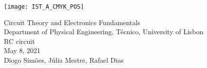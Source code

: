 
\thispagestyle {empty}

\texttt{[image: IST\_A\_CMYK\_POS]}

\begin{center}
%
\vspace{1.0cm}

\vspace{1cm}
{\FontLb Circuit Theory and Electronics Fundamentals} \\ %
\vspace{1cm}
{\FontSn Department of Physical Engineering, Técnico, University of Lisbon} \\ %
\vspace{1cm}
{\FontSn RC circuit } \\
\vspace{1cm}
{\FontSn May 8, 2021} \\ %
{\FontSn Diogo Simões, Júlia Mestre, Rafael Dias}
\end{center}

